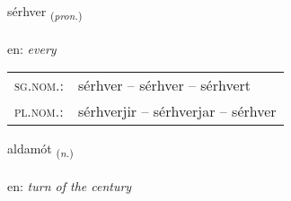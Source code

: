 \documentclass[frontgrid, backgrid]{flacards}\usepackage[]{graphicx}\usepackage[]{xcolor}
\begin{document}
\renewcommand{\flhead}{\vskip5pt \fboxsep=0pt {\small\bfseries\footnotesize Fornafn | Pronoun}}
\renewcommand{\fcfoot}{\vskip5pt \fboxsep=0pt \hspace{2pt}{\small\bfseries\footnotesize 3K}}

\renewcommand{\blhead}{\vskip5pt {\small\bfseries\footnotesize Fornafn | Pronoun }}
\renewcommand{\bcfoot}{\vskip5pt \hspace{2pt}{\small\bfseries\footnotesize 3K}}


{sérhver \small{\textsubscript{(\textit{pron.})}} \\[1ex] %
 \\
en: \emph{every} \\  [2ex]
\renewcommand*{\arraystretch}{0.8}
\begin{tabular}{ll}
\textsc{sg.nom.}: & sérhver  --  sérhver -- sérhvert \\ 
\textsc{pl.nom.}: & sérhverjir -- sérhverjar -- sérhver
\end{tabular}
}

\renewcommand{\flhead}{\vskip5pt \fboxsep=0pt {\small\bfseries\footnotesize Nafnorð | Noun}}
\renewcommand{\fcfoot}{\vskip5pt \fboxsep=0pt \hspace{2pt}{\small\bfseries\footnotesize 3K}}

\renewcommand{\blhead}{\vskip5pt {\small\bfseries\footnotesize Nafnorð | Noun }}
\renewcommand{\bcfoot}{\vskip5pt \hspace{2pt}{\small\bfseries\footnotesize 3K}}


{aldamót \small{\textsubscript{(\textit{n.})}} \\[1ex] %
\textphonetic{[altamout]} \\
en: \emph{turn of the century} \\  [2ex]
\renewcommand*{\arraystretch}{0.8}
}
\end{document}
